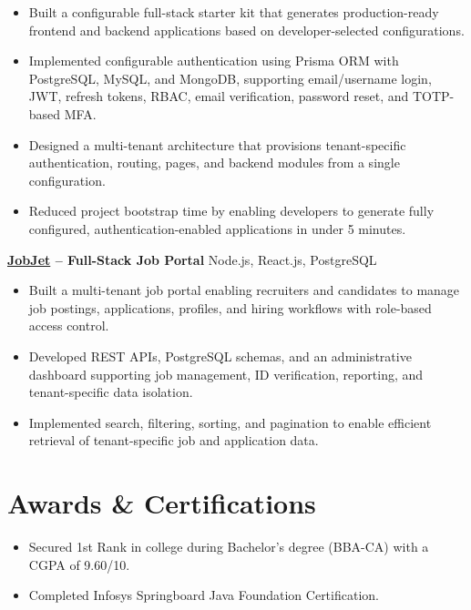 \documentclass[a4paper,10pt]{article}
\begin{document}
\begin{itemize}[leftmargin=*]
    \item Built a configurable full-stack starter kit that generates production-ready frontend and backend applications based on developer-selected configurations.
    \item Implemented configurable authentication using Prisma ORM with PostgreSQL, MySQL, and MongoDB, supporting email/username login, JWT, refresh tokens, RBAC, email verification, password reset, and TOTP-based MFA.
    \item Designed a multi-tenant architecture that provisions tenant-specific authentication, routing, pages, and backend modules from a single configuration.
    \item Reduced project bootstrap time by enabling developers to generate fully configured, authentication-enabled applications in under 5 minutes.
\end{itemize}

\textbf{\href{https://github.com/ShivSarwade/JobJet}{JobJet} -- Full-Stack Job Portal} \hfill Node.js, React.js, PostgreSQL

\begin{itemize}[leftmargin=*]
    \item Built a multi-tenant job portal enabling recruiters and candidates to manage job postings, applications, profiles, and hiring workflows with role-based access control.
    \item Developed REST APIs, PostgreSQL schemas, and an administrative dashboard supporting job management, ID verification, reporting, and tenant-specific data isolation.
    \item Implemented search, filtering, sorting, and pagination to enable efficient retrieval of tenant-specific job and application data.
\end{itemize}



\section*{Awards \& Certifications}

\begin{itemize}[leftmargin=*]
    \item Secured 1st Rank in college during Bachelor's degree (BBA-CA) with a CGPA of 9.60/10.
    \item Completed Infosys Springboard Java Foundation Certification.
\end{itemize}
\end{document}
